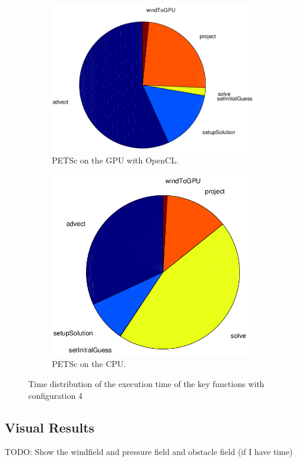\begin{figure}[ht]
	\center
	
	\begin{subfigure}{0.45\textwidth}
		\center
		\includegraphics[width=1.0\textwidth]{results/data/td_conf4_petsc_gpu}
		\caption{PETSc on the GPU with OpenCL.}
		\label{fig:td_conf4_petsc_gpu}
	\end{subfigure}
	\begin{subfigure}{0.45\textwidth}
		\center
		\includegraphics[width=1.0\textwidth]{results/data/td_conf4_petsc_cpu}
		\caption{PETSc on the CPU.}
		\label{fig:td_conf4_petsc_cpu}
	\end{subfigure}
	\caption{Time distribution of the execution time of the key functions
			with configuration 4}
	\label{fig:td_conf4}
	
\end{figure}

\subsection{Visual Results}

TODO: Show the windfield and pressure field and obstacle field (if I have time)
